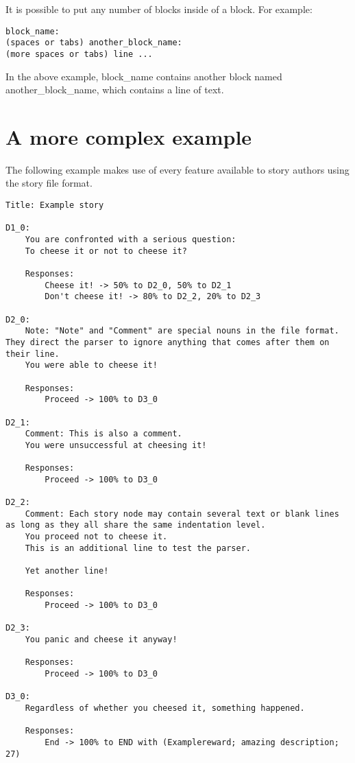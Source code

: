 \documentclass[12pt,letterpaper]{article}
\begin{document}
It is possible to put any number of blocks inside of a block. For example:
\begin{lstlisting}[breaklines=true]
block_name:
(spaces or tabs) another_block_name:
(more spaces or tabs) line ...
\end{lstlisting}

In the above example, block\_name contains another block named another\_block\_name, which contains a line of text.

\section{A more complex example}
The following example makes use of every feature available to story authors using the story file format.

\begin{lstlisting}[breaklines=true]
Title: Example story

D1_0:
    You are confronted with a serious question: 
    To cheese it or not to cheese it?
    
    Responses:
        Cheese it! -> 50% to D2_0, 50% to D2_1
        Don't cheese it! -> 80% to D2_2, 20% to D2_3

D2_0:
    Note: "Note" and "Comment" are special nouns in the file format. They direct the parser to ignore anything that comes after them on their line.
    You were able to cheese it!
    
    Responses:
        Proceed -> 100% to D3_0

D2_1:
    Comment: This is also a comment.
    You were unsuccessful at cheesing it!
    
    Responses:
        Proceed -> 100% to D3_0

D2_2:
    Comment: Each story node may contain several text or blank lines as long as they all share the same indentation level.
    You proceed not to cheese it.
    This is an additional line to test the parser.
    
    Yet another line!
    
    Responses:
        Proceed -> 100% to D3_0

D2_3:
    You panic and cheese it anyway!
    
    Responses:
        Proceed -> 100% to D3_0
        
D3_0:
    Regardless of whether you cheesed it, something happened.
    
    Responses:
        End -> 100% to END with (Examplereward; amazing description; 27)
\end{lstlisting}
\end{document}
